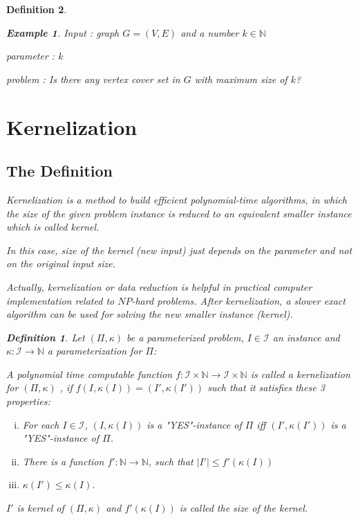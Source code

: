 \documentclass[12pt]{article}
\theoremstyle{slplain}
\newtheorem{defi}{Definition}
\newtheorem{exam}{Example}
\begin{document}
\begin{defi}
\begin{exam}
Input : graph $G = (V, E)$ and a number $k \in \mathbb{N}$

parameter : $k$

problem : Is there any vertex cover set in $G$ with maximum size of $k$?
\end{exam}



\newpage

\section{Kernelization}
\subsection{The Definition}
Kernelization is a method to build efficient polynomial-time algorithms, 
in which the size of the given problem instance is reduced to an equivalent smaller instance which is called kernel. 

In this case, size of the kernel (new input) just depends on the parameter and not on the original input size. 

Actually, kernelization or data reduction is helpful in practical computer implementation related to $NP$-hard problems. After kernelization, a slower exact algorithm can be used for solving the new smaller instance (kernel).

\begin{defi}
Let $(\Pi, \kappa)$ be a parameterized problem, $I\in\mathcal{I}$ an instance and $\kappa: \mathcal{I} \to \mathbb{N}$ a parameterization for $\Pi$:

A polynomial time computable function $f : \mathcal{I} \times \mathbb{N} \to \mathcal{I} \times \mathbb{N}$ is called a
kernelization for $(\Pi, \kappa)$ , if $f(I, \kappa(I)) = (I', \kappa(I'))$ such that it satisfies these 3 properties:

\begin{enumerate}[(i)]
\item For each $I \in \mathcal{I}$, $(I, \kappa(I))$ is a "YES"-instance of $\Pi$ iff $(I', \kappa(I'))$ is a "YES"-instance of $\Pi$.

\item There is a function $f': \mathbb{N} \to \mathbb{N}$, such that $|I'| \leq f'(\kappa(I))$

\item $\kappa(I')\leq \kappa(I)$.
\end{enumerate}

$I'$ is kernel of $(\Pi, \kappa)$ and $f'(\kappa(I))$ is called the size of the kernel.


\end{defi}
\end{defi}
\end{document}
